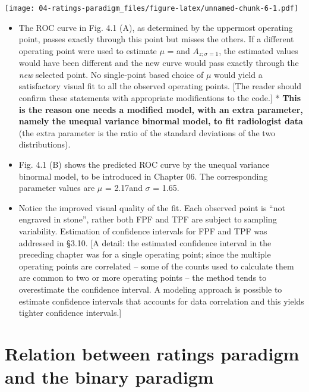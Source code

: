 \documentclass[
]{book}
\begin{document}
\texttt{[image: 04-ratings-paradigm\_files/figure-latex/unnamed-chunk-6-1.pdf]}

\begin{itemize}
\item
  The ROC curve in Fig. 4.1 (A), as determined by the uppermost operating point, passes exactly through this point but misses the others. If a different operating point were used to estimate \(\mu\) = and \(A_{z;\sigma = 1}\), the estimated values would have been different and the new curve would pass exactly through the \emph{new} selected point. No single-point based choice of \(\mu\) would yield a satisfactory visual fit to all the observed operating points. {[}The reader should confirm these statements with appropriate modifications to the code.{]} * \textbf{This is the reason one needs a modified model, with an extra parameter, namely the unequal variance binormal model, to fit radiologist data} (the extra parameter is the ratio of the standard deviations of the two distributions).
\item
  Fig. 4.1 (B) shows the predicted ROC curve by the unequal variance binormal model, to be introduced in Chapter 06. The corresponding parameter values are \(\mu\) = 2.17and \(\sigma\) = 1.65.
\item
  Notice the improved visual quality of the fit. Each observed point is ``not engraved in stone'', rather both FPF and TPF are subject to sampling variability. Estimation of confidence intervals for FPF and TPF was addressed in §3.10. {[}A detail: the estimated confidence interval in the preceding chapter was for a single operating point; since the multiple operating points are correlated -- some of the counts used to calculate them are common to two or more operating points -- the method tends to overestimate the confidence interval. A modeling approach is possible to estimate confidence intervals that accounts for data correlation and this yields tighter confidence intervals.{]}
\end{itemize}

\hypertarget{relation-between-ratings-paradigm-and-the-binary-paradigm}{%
\section{Relation between ratings paradigm and the binary paradigm}\label{relation-between-ratings-paradigm-and-the-binary-paradigm}}
\end{document}
